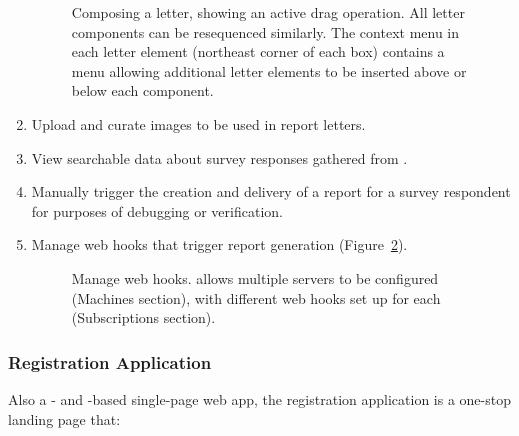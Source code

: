\documentclass{article}
\begin{document}
\begin{enumerate}

  \begin{figure}
    \centering
    \caption{
      Composing a letter, showing an active drag operation.
      All letter components can be resequenced similarly.
      The context menu in each letter element (northeast corner of each box)
      contains a menu allowing additional letter elements to be inserted
      above or below each component.
    }
    \label{fig:compose-letter}
  \end{figure}
\item
  Upload and curate images to be used in report letters.
\item
  View searchable data about survey responses gathered from \qual.
\item
  Manually trigger the creation and delivery of a report for a survey respondent
  for purposes of debugging or verification.
\item
  Manage \qual{} web hooks that trigger report generation
  (Figure~\ref{fig:manage-web-hooks}).

  
  \begin{figure}
    \centering
    \caption{
      Manage \qual{} web hooks.
      \caper{} allows multiple servers to be configured (\textsf{Machines} section),
      with different web hooks set up for each (\textsf{Subscriptions} section).
    }
    \label{fig:manage-web-hooks}
  \end{figure}
\end{enumerate}

\subsubsection{Registration Application}
\label{sec:group-app}

Also a \vue{}- and \vuetify{}-based
single-page web app,
the \caper{} registration application
is a one-stop landing page that:
\end{document}
